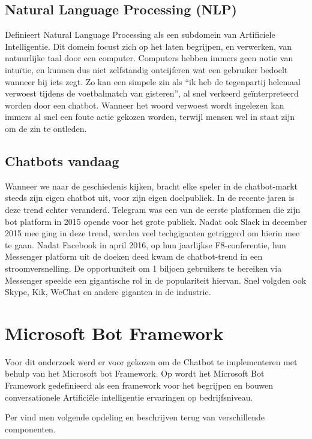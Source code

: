 \subsection{Natural Language Processing (NLP)}
 \textcite{Seif2018} Definieert Natural Language Processing als een subdomein van Artificiele Intelligentie. Dit domein focust zich op het laten begrijpen, en verwerken, van natuurlijke taal door een computer. Computers hebben immers geen notie van intuïtie, en kunnen dus niet zelfstandig ontcijferen wat een gebruiker bedoelt wanneer hij iets zegt. Zo kan een simpele zin als “ik heb de tegenpartij helemaal verwoest tijdens de voetbalmatch van gisteren”, al snel verkeerd geïnterpreteerd worden door een chatbot. Wanneer het woord verwoest wordt ingelezen kan immers al snel een foute actie gekozen worden, terwijl mensen wel in staat zijn om de zin te ontleden.  

\subsection{Chatbots vandaag}
Wanneer we naar de geschiedenis kijken, bracht elke speler in de chatbot-markt steeds zijn eigen chatbot uit, voor zijn eigen doelpubliek. In de recente jaren is deze trend echter veranderd. Telegram was een van de eerste platformen die zijn bot platform in 2015 opende voor het grote publiek. Nadat ook Slack in december 2015 mee ging in deze trend, werden veel techgiganten getriggerd om hierin mee te gaan. Nadat Facebook in april 2016, op hun jaarlijkse F8-conferentie, hun Messenger platform uit de doeken deed kwam de chatbot-trend in een stroomversnelling. De opportuniteit om 1 biljoen gebruikers te bereiken  via Messenger speelde een gigantische rol in de populariteit hiervan. Snel volgden ook Skype, Kik, WeChat en andere giganten in de industrie. 

\section{Microsoft Bot Framework}
Voor dit onderzoek werd er voor gekozen om de Chatbot te implementeren met behulp van het Microsoft bot Framework. 
Op \textcite{Microsoft2019} wordt het Microsoft Bot Framework gedefinieerd als een framework voor het begrijpen en bouwen conversationele Artificiële intelligentie ervaringen op bedrijfsniveau. 

Per \textcite{delta-n2019} vind men volgende opdeling en beschrijven terug van verschillende componenten.

